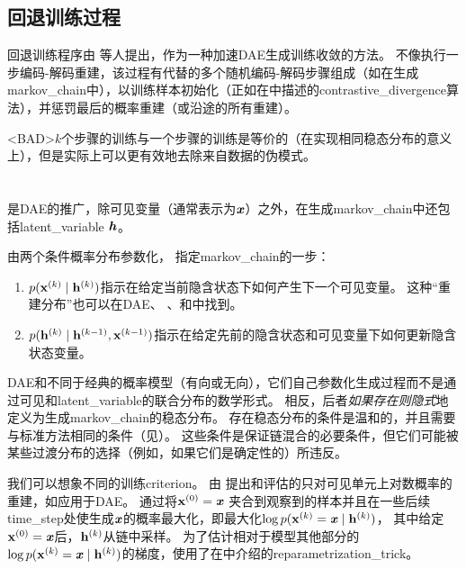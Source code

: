 \subsection{回退训练过程}
\label{sec:walk_back_training_procedure}
回退训练程序由\citet{Bengio-et-al-NIPS2013-small} 等人提出，作为一种加速\gls{DAE}生成训练收敛的方法。
不像执行一步编码-解码重建，该过程有代替的多个随机编码-解码步骤组成（如在生成\gls{markov_chain}中），以训练样本初始化（正如在中描述的\gls{contrastive_divergence}算法），并惩罚最后的概率重建（或沿途的所有重建）。

<BAD>$k$个步骤的训练与一个步骤的训练是等价的（在实现相同稳态分布的意义上），但是实际上可以更有效地去除来自数据的伪模式。


\section{}
\label{sec:generative_stochastic_networks}
 \citep{Bengio-et-al-ICML-2014} 是\gls{DAE}的推广，除可见变量（通常表示为$\boldsymbol{\mathit{x}}$）之外，在生成\gls{markov_chain}中还包括\gls{latent_variable} $\boldsymbol{\mathit{h}}$。

由两个条件概率分布参数化， 指定\gls{markov_chain}的一步：
\begin{enumerate}
 \item $p(\mathbf{x}^{(k)}  \mid \mathbf{h}^{(k)} )$指示在给定当前隐含状态下如何产生下一个可见变量。
 这种``重建分布''也可以在\gls{DAE}、 、和中找到。
 \item $p(\mathbf{h}^{(k)}  \mid \mathbf{h}^{(k-1)}, \mathbf{x}^{(k-1)})$指示在给定先前的隐含状态和可见变量下如何更新隐含状态变量。
\end{enumerate}

\gls{DAE}和不同于经典的概率模型（有向或无向），它们自己参数化生成过程而不是通过可见和\gls{latent_variable}的联合分布的数学形式。
相反，后者\emph{如果存在则隐式}地定义为生成\gls{markov_chain}的稳态分布。
存在稳态分布的条件是温和的，并且需要与标准方法相同的条件（见）。
这些条件是保证链混合的必要条件，但它们可能被某些过渡分布的选择（例如，如果它们是确定性的）所违反。


我们可以想象不同的训练\gls{criterion}。
由\citet{Bengio-et-al-ICML-2014} 提出和评估的只对可见单元上对数概率的重建，如应用于\gls{DAE}。
通过将$\mathbf{x}^{(0)} = \boldsymbol{\mathit{x}}$ 夹合到观察到的样本并且在一些后续\gls{time_step}处使生成$\boldsymbol{\mathit{x}}$的概率最大化，即最大化$\log p(\mathbf{x}^{(k)} = \boldsymbol{\mathit{x}}  \mid  \mathbf{h}^{(k)})$， 其中给定$\mathbf{x}^{(0)} = \boldsymbol{\mathit{x}}$后，$\mathbf{h}^{(k)}$从链中采样。
为了估计相对于模型其他部分的$\log p(\mathbf{x}^{(k)} = \boldsymbol{\mathit{x}}  \mid  \mathbf{h}^{(k)})$的梯度，\citet{Bengio-et-al-ICML-2014}使用了在中介绍的\gls{reparametrization_trick}。

